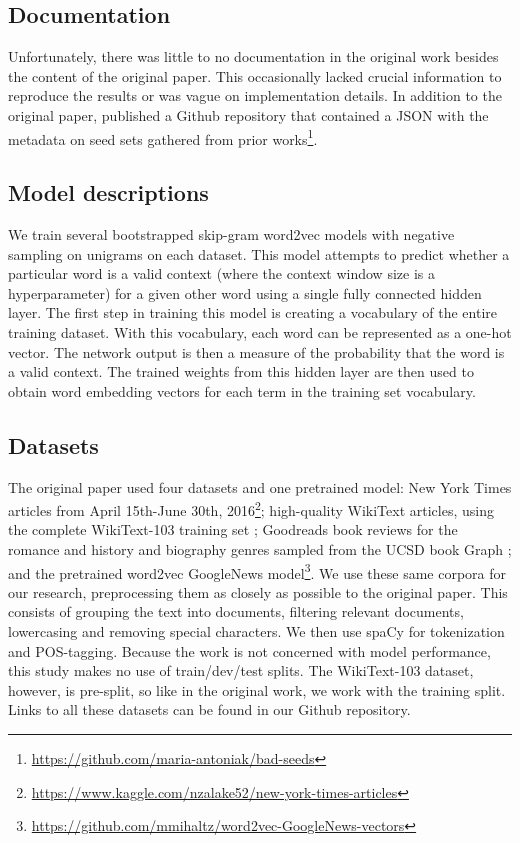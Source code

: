 \subsection{Documentation}

Unfortunately, there was little to no documentation in the original work besides the content of the
original paper. This occasionally lacked crucial information to reproduce the results or was vague
on implementation details. In addition to the original paper, \citet{antoniak-mimno-2021-bad}
published a Github repository that contained a JSON with the metadata on seed sets gathered from
prior
works\footnote{\label{footnote:badseedsrepo}\href{https://github.com/maria-antoniak/bad-seeds}{https://github.com/maria-antoniak/bad-seeds}}.

\subsection{Model descriptions}

We train several bootstrapped skip-gram word2vec models with negative sampling on unigrams on each
dataset. This model attempts to predict whether a particular word is a valid context (where the
context window size is a hyperparameter) for a given other word using a single fully connected
hidden layer. The first step in training this model is creating a vocabulary of the entire training
dataset. With this vocabulary, each word can be represented as a one-hot vector. The network output
is then a measure of the probability that the word is a valid context. The trained weights from this
hidden layer are then used to obtain word embedding vectors for each term in the training set
vocabulary.

\subsection{Datasets}

The original paper used four datasets and one pretrained model: New York Times articles from April
15th-June 30th,
2016\footnote{\href{https://www.kaggle.com/nzalake52/new-york-times-articles}{https://www.kaggle.com/nzalake52/new-york-times-articles}};
high-quality WikiText articles, using the complete WikiText-103 training set
\citep{DBLP:journals/corr/MerityXBS16}; Goodreads book reviews for the romance and history and
biography genres sampled from the UCSD book Graph \citep{10.1145/3240323.3240369,
	wan-etal-2019-fine}; and the pretrained word2vec GoogleNews
model\footnote{\label{footnote:googlenews}\href{https://github.com/mmihaltz/word2vec-GoogleNews-vectors}{https://github.com/mmihaltz/word2vec-GoogleNews-vectors}}.
We use these same corpora for our research, preprocessing them as closely as possible to the
original paper. This consists of grouping the text into documents, filtering relevant documents,
lowercasing and removing special characters. We then use spaCy
\citep{honnibalSpaCyIndustrialstrengthNatural2020} for tokenization and POS-tagging. Because the
work is not concerned with model performance, this study makes no use of train/dev/test splits. The
WikiText-103 dataset, however, is pre-split, so like in the original work, we work with the training
split. Links to all these datasets can be found in our Github repository.

